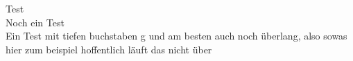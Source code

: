 \documentclass[preview]{standalone}
\begin{document}
Test\\Noch ein Test\\Ein Test mit tiefen buchstaben g und am besten auch noch überlang, also sowas hier zum beispiel hoffentlich läuft das nicht über\\
\end{document}
